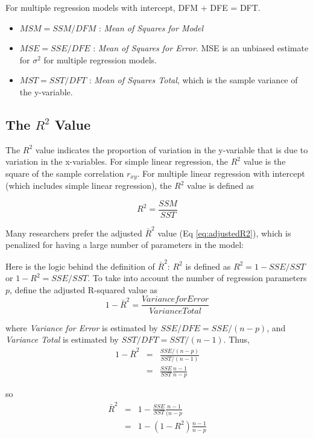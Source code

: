 For multiple regression models with intercept, DFM + DFE = DFT.

\begin{itemize}
  \item $MSM = SSM / DFM$ : \emph{Mean of Squares for Model}
  \item $MSE = SSE / DFE$ : \emph{Mean of Squares for Error}. MSE is an unbiased estimate for $\sigma^2$ for multiple regression models.
  \item $MST = SST / DFT$ : \emph{Mean of Squares Total}, which is the sample variance of the y-variable.
\end{itemize}

\subsection{The $R^2$ Value}

The $R^2$ value indicates the proportion of variation in the y-variable that is due to variation in the x-variables. For simple linear regression, the $R^2$ value is the square of the sample correlation $r_{xy}$. For multiple linear regression with intercept (which includes simple linear regression), the $R^2$ value is defined as

\begin{equation}
  R^2 = \frac{SSM}{SST}
\end{equation}

Many researchers prefer the adjusted $\bar{R}^2$ value (Eq \ref{eq:adjustedR2}), which is penalized for having a large number of parameters in the model:

Here is the logic behind the definition of $\bar{R}^2$:
$R^2$ is defined as $R^2 = 1 - SSE/SST$ or $1 - R^2 = SSE/SST$. To take into account the number of regression parameters $p$, define the adjusted R-squared value as
\begin{equation}
  1- \bar{R}^2 = \frac{Variance for Error}{Variance Total}
\end{equation}

where \emph{Variance for Error }is estimated by $SSE/DFE = SSE/(n-p)$, and \emph{Variance Total }is estimated by $SST/DFT = SST/(n-1)$. Thus,
\begin{eqnarray}
    1 - \bar{R}^2 &=& \frac{SSE/(n - p)}{SST/(n - 1)} \\
          	&=& \frac{SSE}{SST}\frac{n - 1}{n - p}
\end{eqnarray}

    so
\begin{eqnarray}
  \bar{R}^2 &=& 1 - \frac{SSE}{SST} \frac{n - 1}{(n - p} \\
    &=& 1 - (1 - R^2)\frac{n - 1}{n - p}
\end{eqnarray}


